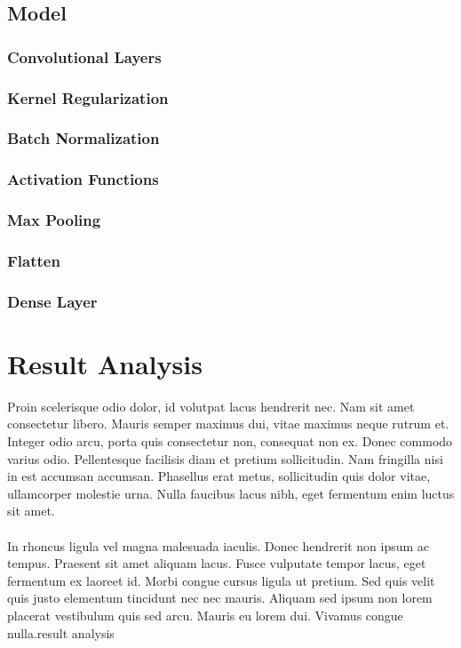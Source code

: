 \documentclass[journal]{IEEEtran}
\begin{document}
\subsection{Model}
\subsubsection{Convolutional Layers}
\subsubsection{Kernel Regularization}
\subsubsection{Batch Normalization}
\subsubsection{Activation Functions}
\subsubsection{Max Pooling}
\subsubsection{Flatten}
\subsubsection{Dense Layer}
%
%
\section{Result Analysis}
Proin scelerisque odio dolor, id volutpat lacus hendrerit nec. Nam sit amet consectetur libero. Mauris semper maximus dui, vitae maximus neque rutrum et. Integer odio arcu, porta quis consectetur non, consequat non ex. Donec commodo varius odio. Pellentesque facilisis diam et pretium sollicitudin. Nam fringilla nisi in est accumsan accumsan. Phasellus erat metus, sollicitudin quis dolor vitae, ullamcorper molestie urna. Nulla faucibus lacus nibh, eget fermentum enim luctus sit amet.\\\\In rhoncus ligula vel magna malesuada iaculis. Donec hendrerit non ipsum ac tempus. Praesent sit amet aliquam lacus. Fusce vulputate tempor lacus, eget fermentum ex laoreet id. Morbi congue cursus ligula ut pretium. Sed quis velit quis justo elementum tincidunt nec nec mauris. Aliquam sed ipsum non lorem placerat vestibulum quis sed arcu. Mauris eu lorem dui. Vivamus congue nulla.result analysis
\ifCLASSOPTIONcaptionsoff
  \newpage
\fi


\vfill
\end{document}

